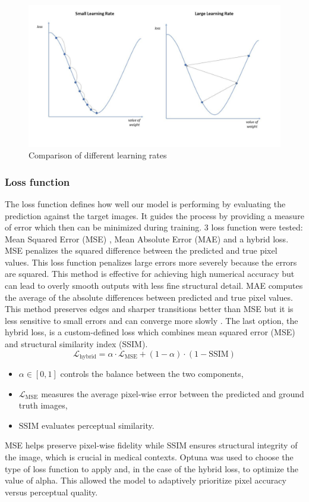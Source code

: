 \documentclass[twocolumn]{article}
\begin{document}
\begin{figure}
    \centering
    \includegraphics[width=1\linewidth]{Learn rate.jpg}
    \caption{Comparison of different learning rates}
    \label{fig:Learnrate}
\end{figure}

\subsubsection{Loss function}
The loss function defines how well our model is performing by evaluating the prediction against the target images. 
It guides the process by providing a measure of error which then can be minimized during training. 
3 loss function were tested: Mean Squared Error (MSE) , Mean Absolute Error (MAE) and a hybrid loss. 
MSE penalizes the squared difference between the predicted and true pixel values. 
This loss function penalizes large errors more severely because the errors are squared. 
This method is effective for achieving high numerical accuracy but can lead to overly smooth outputs with less fine structural detail.
MAE computes the average of the absolute differences between predicted and true pixel values. 
This method preserves edges and sharper transitions better than MSE but it is less sensitive to small errors and can converge more slowly \cite{anderson_2023_loss}.
The last option, the hybrid loss, is a custom-defined loss which combines mean squared error (MSE) and structural similarity index (SSIM).
\begin{equation}\label{eq:3}
\mathcal{L}_{\text{hybrid}} = \alpha \cdot \mathcal{L}_{\text{MSE}} + (1 - \alpha) \cdot (1 - \text{SSIM})
\end{equation}
\begin{itemize}
    \item $\alpha \in [0, 1]$ controls the balance between the two components,
    \item $\mathcal{L}_{\text{MSE}}$ measures the average pixel-wise error between the predicted and ground truth images,
    \item $\text{SSIM}$ evaluates perceptual similarity.
\end{itemize}
MSE helps preserve pixel-wise fidelity while SSIM ensures structural integrity of the image, which is crucial in medical contexts. 
Optuna was used to choose the type of loss function to apply and, in the case of the hybrid loss, to optimize the value of alpha. 
This allowed the model to adaptively prioritize pixel accuracy versus perceptual quality. 
\end{document}
